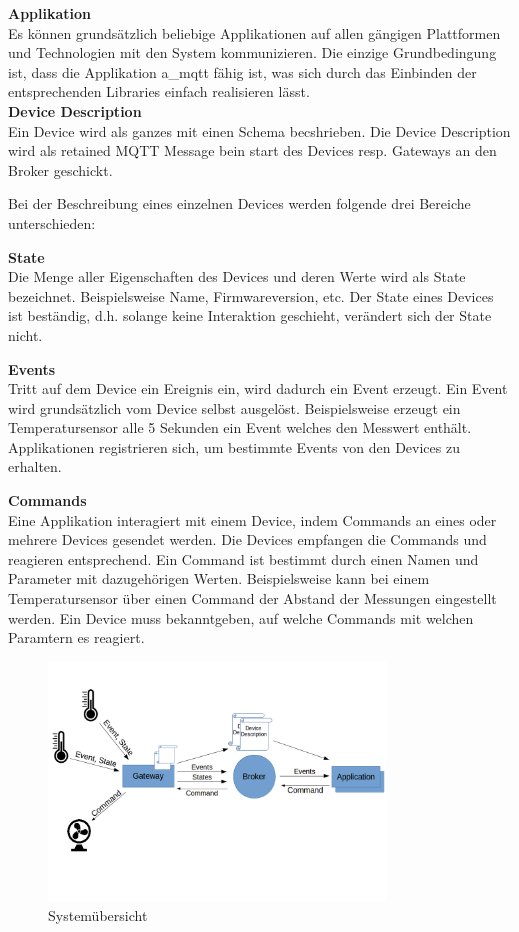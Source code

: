 \textbf{Applikation} \\
Es können grundsätzlich beliebige Applikationen auf allen gängigen Plattformen und Technologien mit den System kommunizieren. Die einzige Grundbedingung ist, dass die Applikation \acrshort{a_mqtt} fähig ist, was sich durch das Einbinden der entsprechenden Libraries einfach realisieren lässt.
\\


\textbf{Device Description} \\
Ein Device wird als ganzes mit einen Schema becshrieben. Die Device Description wird als retained MQTT Message bein start des Devices resp. Gateways an den Broker geschickt.

Bei der Beschreibung eines einzelnen Devices werden folgende drei Bereiche unterschieden:

\textbf{State} \\
Die Menge aller Eigenschaften des Devices und deren Werte wird als State bezeichnet. Beispielsweise Name, Firmwareversion, etc. Der State eines Devices ist beständig, d.h. solange keine Interaktion geschieht, verändert sich der State nicht.


\textbf{Events} \\
Tritt auf dem Device ein Ereignis ein, wird dadurch ein Event erzeugt. Ein Event wird grundsätzlich vom Device selbst ausgelöst. Beispielsweise erzeugt ein Temperatursensor alle 5 Sekunden ein Event welches den Messwert enthält. Applikationen registrieren sich, um bestimmte Events von den Devices zu erhalten.


\textbf{Commands} \\
Eine Applikation interagiert mit einem Device, indem Commands an eines oder mehrere Devices gesendet werden. Die Devices empfangen die Commands und reagieren entsprechend. Ein Command ist bestimmt durch einen Namen und Parameter mit dazugehörigen Werten. 
Beispielsweise kann bei einem Temperatursensor über einen Command  der Abstand der Messungen eingestellt werden.
Ein Device muss bekanntgeben, auf welche Commands mit welchen Paramtern es reagiert.


\begin{figure}[H]
	\centering
		\includegraphics[width=0.8\textwidth]{diag/Overview.png}
	\caption{\label{fig:overview}Systemübersicht}
\end{figure}


